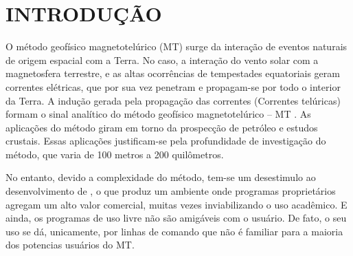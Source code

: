 \setcounter{page}{14}
\chapter{INTRODUÇÃO}
   


    
    
    O método geofísico magnetotelúrico (MT) surge da interação de eventos naturais de origem espacial com a Terra. No caso, a interação do vento solar com a magnetosfera terrestre, e as altas ocorrências de tempestades equatoriais geram correntes elétricas, que por sua vez penetram e propagam-se por todo o interior da Terra. A indução gerada pela propagação das correntes (Correntes telúricas) formam o sinal analítico do método geofísico magnetotelúrico -- MT \cite{parkinson93}. As aplicações do método giram em torno da prospecção de petróleo e estudos crustais. Essas aplicações justificam-se pela profundidade de investigação do método, que varia de 100 metros a 200 quilômetros.

    No entanto, devido a complexidade do método, tem-se um desestimulo ao desenvolvimento de \softwares, o que produz um ambiente onde programas proprietários agregam um alto valor comercial, muitas vezes inviabilizando o uso acadêmico. E ainda, os programas de uso livre não são amigáveis com o usuário. De fato, o seu uso se dá, unicamente, por linhas de comando que não é familiar para a maioria dos potencias usuários do MT.

